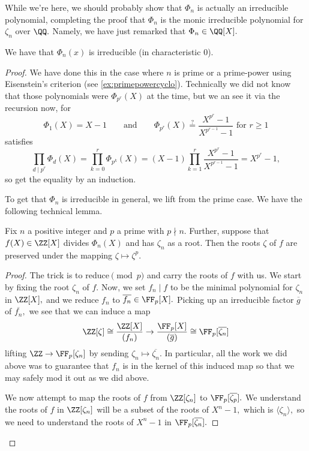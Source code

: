 \documentclass[../notes.tex]{subfiles}
\begin{document}
While we're here, we should probably show that $\Phi_n$ is actually an irreducible polynomial, completing the proof that $\Phi_n$ is the monic irreducible polynomial for $\zeta_n$ over $\QQ.$ Namely, we have just remarked that $\Phi_n\in\QQ[X].$
\begin{proposition}
	We have that $\Phi_n(x)$ is irreducible (in characteristic $0$).
\end{proposition}
\begin{proof}
	We have done this in the case where $n$ is prime or a prime-power using Eisenstein's criterion (see \autoref{ex:primepowercyclo}). Technically we did not know that those polynomials were $\Phi_{p^r}(X)$ at the time, but we an see it via the recursion now, for
	\[\Phi_1(X)=X-1\qquad\text{and}\qquad\Phi_{p^r}(X)\stackrel?=\frac{X^{p^r}-1}{X^{p^{r-1}}-1}\text{  for  }r\ge1\]
	satisfies
	\[\prod_{d\mid p^r}\Phi_d(X)=\prod_{k=0}^r\Phi_{p^k}(X)=(X-1)\prod_{k=1}^r\frac{X^{p^r}-1}{X^{p^{r-1}}-1}=X^{p^r}-1,\]
	so get the equality by an induction.

	To get that $\Phi_n$ is irreducible in general, we lift from the prime case. We have the following technical lemma.
	\begin{lemma} \label{lem:embedroots}
		Fix $n$ a positive integer and $p$ a prime with $p\nmid n.$ Further, suppose that $f(X)\in\ZZ[X]$ divides $\Phi_n(X)$ and has $\zeta_n$ as a root. Then the roots $\zeta$ of $f$ are preserved under the mapping $\zeta\mapsto\zeta^p.$
	\end{lemma}
	\begin{proof}
		The trick is to reduce$\pmod p$ and carry the roots of $f$ with us. We start by fixing the root $\zeta_n$ of $f.$ Now, we set $f_n\mid f$ to be the minimal polynomial for $\zeta_n$ in $\ZZ[X],$
		and we reduce $f_n$ to $\overline{f_n}\in\FF_p[X].$ Picking up an irreducible factor $\overline g$ of $\overline{f_n},$ we see that we can induce a map
		\[\ZZ[\zeta]\cong\frac{\ZZ[X]}{(f_n)}\to\frac{\FF_p[X]}{(\overline g)}\cong\FF_p[\overline{\zeta_n}]\]
		lifting $\ZZ\to\FF_p[\zeta_n]$ by sending $\zeta_n\mapsto\overline{\zeta_n}.$ In particular, all the work we did above was to guarantee that $f_n$ is in the kernel of this induced map so that we may safely mod it out as we did above.
		
		We now attempt to map the roots of $f$ from $\ZZ[\zeta_n]$ to $\FF_p[\overline{\zeta_p}].$ We understand the roots of $f$ in $\ZZ[\zeta_n]$ will be a subset of the roots of $X^n-1,$ which is $\langle\zeta_n\rangle,$ so we need to understand the roots of $X^n-1$ in $\FF_p[\overline{\zeta_n}].$
		

\end{proof}
\end{proof}
\end{document}
